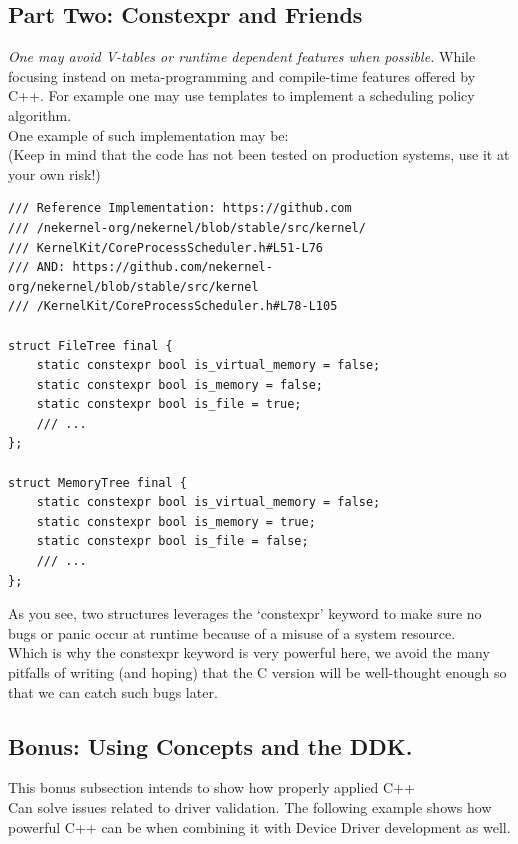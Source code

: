 \documentclass[11pt, a4paper]{article}
\begin{document}
\subsection{Part Two: Constexpr and Friends}
{
\textit{One may avoid V-tables or runtime dependent features when possible.}
While focusing instead on meta-programming and compile-time features offered by C++. For example one may use templates to implement a scheduling policy algorithm. \\
One example of such implementation may be: \\

(Keep in mind that the code has not been tested on production systems, use it at your own risk!)

\begin{lstlisting}
/// Reference Implementation: https://github.com
/// /nekernel-org/nekernel/blob/stable/src/kernel/
/// KernelKit/CoreProcessScheduler.h#L51-L76
/// AND: https://github.com/nekernel-org/nekernel/blob/stable/src/kernel
/// /KernelKit/CoreProcessScheduler.h#L78-L105

struct FileTree final {
    static constexpr bool is_virtual_memory = false;
    static constexpr bool is_memory = false;
    static constexpr bool is_file = true;
    /// ...
};

struct MemoryTree final {
    static constexpr bool is_virtual_memory = false;
    static constexpr bool is_memory = true;
    static constexpr bool is_file = false;
    /// ...
};
\end{lstlisting}

As you see, two structures leverages the `constexpr' keyword to make sure
no bugs or panic occur at runtime because of a misuse of a system resource. \\

Which is why the constexpr keyword is very powerful here, we avoid the many pitfalls of writing (and hoping) that the C version will be well-thought enough so that we can catch such bugs later.

\subsection{Bonus: Using Concepts and the DDK.}
{
This bonus subsection intends to show how properly applied C++\\
Can solve issues related to driver validation.
The following example shows how powerful C++ can be when combining it with Device Driver development as well.

}}
\end{document}
